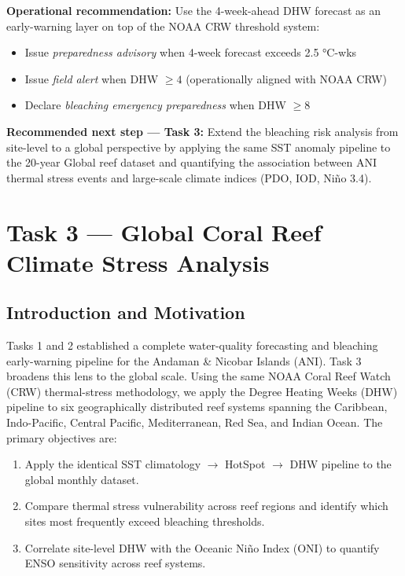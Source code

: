 \documentclass[12pt,a4paper]{report}
\begin{document}
\begin{findingbox}
\vspace{6pt}
\textbf{Operational recommendation:} Use the 4-week-ahead DHW forecast as an
early-warning layer on top of the NOAA CRW threshold system:
\begin{itemize}[leftmargin=*, nosep]
  \item Issue \textit{preparedness advisory} when 4-week forecast exceeds 2.5 °C-wks
  \item Issue \textit{field alert} when DHW $\geq 4$ (operationally aligned with NOAA CRW)
  \item Declare \textit{bleaching emergency preparedness} when DHW $\geq 8$
\end{itemize}

\vspace{6pt}
\textbf{Recommended next step --- Task 3:} Extend the bleaching risk analysis
from site-level to a global perspective by applying the same SST anomaly pipeline
to the 20-year Global reef dataset and quantifying the association between ANI
thermal stress events and large-scale climate indices (PDO, IOD, Niño 3.4).
\end{findingbox}


\chapter{Task 3 — Global Coral Reef Climate Stress Analysis}

\section{Introduction and Motivation}

Tasks 1 and 2 established a complete water-quality forecasting and bleaching early-warning pipeline for the Andaman \& Nicobar Islands (ANI).
Task 3 broadens this lens to the global scale.
Using the same NOAA Coral Reef Watch (CRW) thermal-stress methodology, we apply the Degree Heating Weeks (DHW) pipeline to six geographically distributed reef systems spanning the Caribbean, Indo-Pacific, Central Pacific, Mediterranean, Red Sea, and Indian Ocean.
The primary objectives are:
\begin{enumerate}
  \item Apply the identical SST climatology $\to$ HotSpot $\to$ DHW pipeline to the global monthly dataset.
  \item Compare thermal stress vulnerability across reef regions and identify which sites most frequently exceed bleaching thresholds.
  \item Correlate site-level DHW with the Oceanic Niño Index (ONI) to quantify ENSO sensitivity across reef systems.
\end{enumerate}
\end{document}
